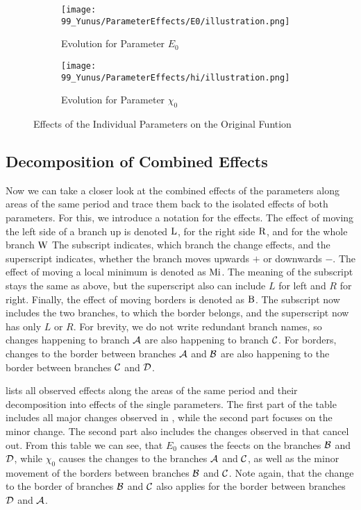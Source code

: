 \begin{figure}
    \centering
    \begin{subfigure}{0.4\textwidth}
        \texttt{[image: 99\_Yunus/ParameterEffects/E0/illustration.png]}
        \caption{Evolution for Parameter $E_0$}
        \label{fig:yunus.function.evolution.e0}
    \end{subfigure}
    \begin{subfigure}{0.4\textwidth}
        \texttt{[image: 99\_Yunus/ParameterEffects/hi/illustration.png]}
        \caption{Evolution for Parameter $\chi_0$}
        \label{fig:yunus.function.evolution.hi}
    \end{subfigure}
    \caption{Effects of the Individual Parameters on the Original Funtion}
\end{figure}

\subsection{Decomposition of Combined Effects}
\label{sec:yunus.param.effects.decomposition}

Now we can take a closer look at the combined effects of the parameters along areas of the same period and trace them back to the isolated effects of both parameters.
For this, we introduce a notation for the effects.
The effect of moving the left side of a branch up is denoted $\operatorname{L}$, for the right side $\operatorname{R}$, and for the whole branch $\operatorname{W}$
The subscript indicates, which branch the change effects, and the superscript indicates, whether the branch moves upwards $+$ or downwards $-$.
The effect of moving a local minimum is denoted as $\operatorname{Mi}$.
The meaning of the subscript stays the same as above, but the superscript also can include $L$ for left and $R$ for right.
Finally, the effect of moving borders is denoted as $\operatorname{B}$.
The subscript now includes the two branches, to which the border belongs, and the superscript now has only $L$ or $R$.
For brevity, we do not write redundant branch names, so changes happening to branch $\mathcal{A}$ are also happening to branch $\mathcal{C}$.
For borders, changes to the border between branches $\mathcal{A}$ and $\mathcal{B}$ are also happening to the border between branches $\mathcal{C}$ and $\mathcal{D}$.

 lists all observed effects along the areas of the same period and their decomposition into effects of the single parameters.
The first part of the table includes all major changes observed in , while the second part focuses on the minor change.
The second part also includes the changes observed in  that cancel out.
From this table we can see, that $E_0$ causes the feects on the branches $\mathcal{B}$ and $\mathcal{D}$, while $\chi_0$ causes the changes to the branches $\mathcal{A}$ and $\mathcal{C}$, as well as the minor movement of the borders between branches $\mathcal{B}$ and $\mathcal{C}$.
Note again, that the change to the border of branches $\mathcal{B}$ and $\mathcal{C}$ also applies for the border between branches $\mathcal{D}$ and $\mathcal{A}$.

